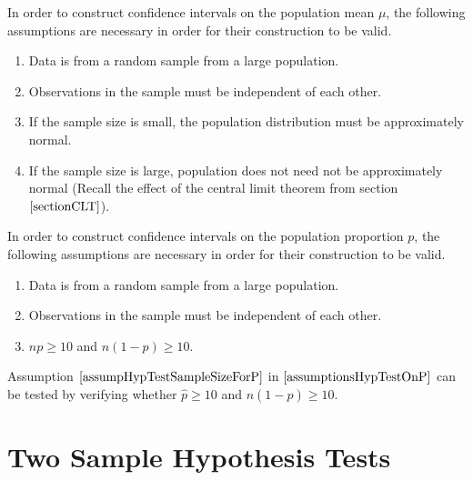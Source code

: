 \begin{assumptions}
In order to construct confidence intervals on the population mean $\mu$, 
the following assumptions are necessary in order for their construction to be valid.

\begin{enumerate}
\justifying
\item Data is from a random sample from a large population.			
\item Observations in the sample must be independent of each other.	
\item If the sample size is small, the population distribution must be approximately normal.		
\item If the sample size is large, population does not need not be approximately normal (Recall the effect of the central limit theorem from section $\ref{sectionCLT}$).
\end{enumerate}

\end{assumptions}





\begin{assumptions}
\label{assumptionsHypTestOnP}
In order to construct confidence intervals on the population proportion $p$, 
the following assumptions are necessary in order for their construction to be valid.

\begin{enumerate}
\justifying
\item Data is from a random sample from a large population.
\item Observations in the sample must be independent of each other.
\item	$np \geq 10$ and $n(1-p) \geq 10$.	\label{assumpHypTestSampleSizeForP}
\end{enumerate}

\end{assumptions}

\begin{nt}
Assumption $\ref{assumpHypTestSampleSizeForP}$ in $\ref{assumptionsHypTestOnP}$
can be tested by verifying whether $\hat{p} \geq 10$ and $n (1 - \hat{p}) \geq 10$.
\end{nt}








\section{Two Sample Hypothesis Tests}


